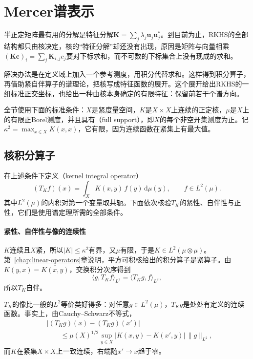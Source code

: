 \section{Mercer谱表示}
\label{sec:rkhs-mercer}

半正定矩阵最有用的分解是特征分解$\bm K=\sum_j\lambda_j\bm u_j\bm u_j^*$。到目前为止，RKHS的全部结构都只由核决定，核的“特征分解”却还没有出现，原因是矩阵与向量相乘$(\bm K\bm c)_i=\sum_j\bm K_{i,j}c_j$要对下标求和，而不可数的下标集合上没有现成的求和。

解决办法是在定义域上加入一个参考测度，用积分代替求和。这样得到积分算子，再借助紧自伴算子的谱理论，把核写成特征函数的展开。这个展开给出RKHS的一组标准正交坐标，也给出一种由核本身确定的有限特征：保留前若干个谱方向。

全节使用下面的标准条件：$X$是紧度量空间，$K$是$X\times X$上连续的正定核，$\mu$是$X$上的有限正Borel测度，并且具有（full support），即$X$的每个非空开集测度为正。记$\kappa^2=\max_{x\in X}K(x,x)$，它有限，因为连续函数在紧集上有最大值。

\subsection{核积分算子}
\label{sec:rkhs-integral-operator}

在上述条件下定义（kernel integral operator）
\begin{equation}
(T_Kf)(x)=\int_XK(x,y)\,f(y)\,\mathrm d\mu(y),\qquad f\in L^2(\mu).
\label{eq:rkhs-integral-operator}
\end{equation}
其中$L^2(\mu)$的内积对第一个变量取共轭。下面依次核验$T_K$的紧性、自伴性与正性，它们是使用谱定理所需的全部条件。

\paragraph{紧性、自伴性与像的连续性}

$K$连续且$X$紧，所以$\lvert K\rvert\leq\kappa^2$有界，又$\mu$有限，于是$K\in L^2(\mu\otimes\mu)$。第~\ref{chap:linear-operators}章说明，平方可积核给出的积分算子是紧算子。由$K(y,x)=\overline{K(x,y)}$，交换积分次序得到
\[
\langle g,T_Kf\rangle_{L^2}=\langle T_Kg,f\rangle_{L^2} ,
\]
所以$T_K$自伴。

$T_K$的像比一般的$L^2$等价类好得多：对任意$g\in L^2(\mu)$，$T_Kg$是处处有定义的连续函数。事实上，由Cauchy--Schwarz不等式，
\[
\begin{aligned}
&\lvert(T_Kg)(x)-(T_Kg)(x')\rvert\\
&\qquad\leq\mu(X)^{1/2}\sup_{y\in X}\lvert K(x,y)-K(x',y)\rvert\,\lVert g\rVert_{L^2},
\end{aligned}
\]
而$K$在紧集$X\times X$上一致连续，右端随$x'\to x$趋于零。

